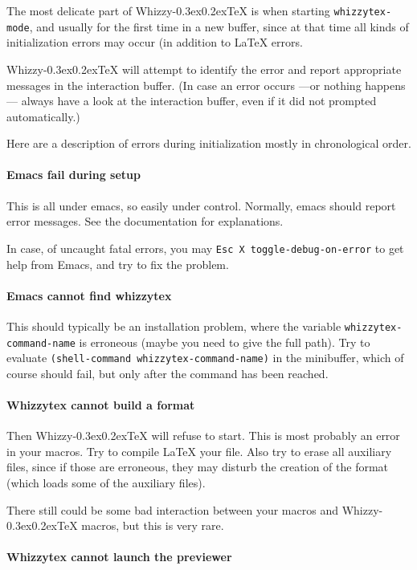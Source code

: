 \documentclass{article}
\makeatletter
\let \lst \verb
\def \whizzy {{Whizzy\kern -0.3ex\raise 0.2ex\hbox{\let \@\relax\TeX}}}
\makeatother
\begin{document}
The most delicate part of {\whizzy} is when starting {\tt whizzytex-mode},
and usually for the first time in a new buffer, since at that time all kinds
of initialization errors may occur (in addition to {\LaTeX} errors. 

{\whizzy} will attempt to identify the error and report appropriate messages
in the interaction buffer. (In case an error occurs ---or nothing happens---
always have a look at the interaction buffer, even if it did not prompted
automatically.)

Here are a description of errors during initialization mostly in
chronological order. 

\paragraph {Emacs fail during setup}

This is all under emacs, so easily under control.
Normally, emacs should report error messages. See the documentation for
explanations. 

In case, of uncaught fatal errors, you may
\verb"Esc X toggle-debug-on-error" to get help from Emacs, and try to fix
the problem. 

\paragraph {Emacs cannot find whizzytex}

This should typically be an installation problem, where the variable
\lst"whizzytex-command-name" is erroneous (maybe you need to give the full
path). Try to evaluate \verb"(shell-command whizzytex-command-name)" in the
minibuffer, which of course should fail, but only after the command has been
reached.

\paragraph {Whizzytex cannot build a format}

Then {\whizzy} will refuse to start.  This is most probably an error in your
macros.  Try to compile {\LaTeX} your file.  
Also try to erase all auxiliary files, since if those are erroneous, they
may disturb the creation of the format (which loads some of the auxiliary
files). 

There still could be some bad interaction between your macros and {\whizzy}
macros, but this is very rare.

\paragraph {Whizzytex cannot launch the previewer}
\end{document}
